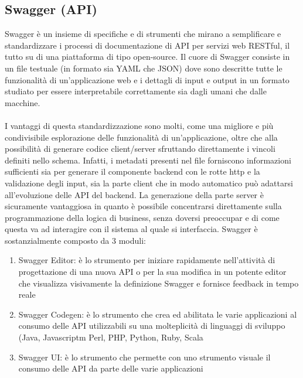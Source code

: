 \subsection{Swagger (API)}
Swagger è un insieme di specifiche e di strumenti che mirano a semplificare e
standardizzare i processi di documentazione di API per servizi web RESTful, il tutto su
di una piattaforma di tipo open-source.
Il cuore di Swagger consiste in un file testuale (in formato sia YAML che JSON) dove
sono descritte tutte le funzionalità di un’applicazione web e i dettagli di input e output
in un formato studiato per essere interpretabile correttamente sia dagli umani che
dalle macchine.
\paragraph{}

I vantaggi di questa standardizzazione sono molti, come una migliore e più condivisibile
esplorazione delle funzionalità di un’applicazione, oltre che alla possibilità di
generare codice client/server sfruttando direttamente i vincoli definiti nello schema. Infatti, i metadati presenti nel file forniscono informazioni sufficienti sia per
generare il componente backend con le rotte http e la validazione degli input, sia la parte client che in modo automatico può adattarsi all’evoluzione delle API del backend. La generazione della parte server è sicuramente vantaggiosa in quanto è possibile concentrarsi direttamente sulla programmazione della logica di business, senza doversi preoccupar e di come questa va ad interagire con il sistema al quale si interfaccia. Swagger è sostanzialmente composto da 3 moduli: 
\begin{enumerate}
    \item Swagger Editor: è lo strumento per iniziare rapidamente nell’attività di
    progettazione di una nuova API o per la sua modifica in un potente editor che
    visualizza visivamente la definizione Swagger e fornisce feedback in tempo
    reale
    \item Swagger Codegen: è lo strumento che crea ed abilitata le varie applicazioni al
    consumo delle API utilizzabili su una molteplicità di linguaggi di sviluppo (Java,
    Javascriptm Perl, PHP, Python, Ruby, Scala
    \item Swagger UI: è lo strumento che permette con uno strumento visuale il
    consumo delle API da parte delle varie applicazioni
\end{enumerate}


\paragraph{}

